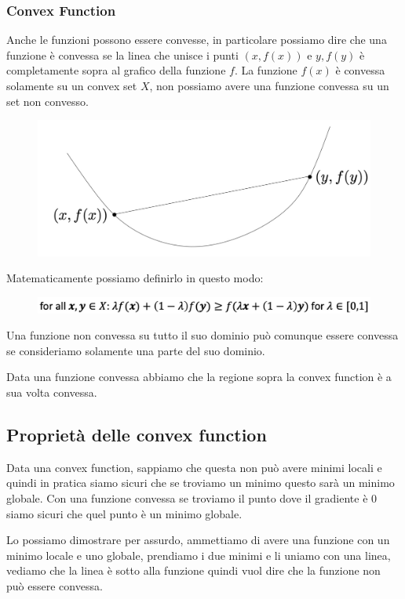 \documentclass[14pt]{extreport}
\begin{document}
\subsubsection{Convex Function}

Anche le funzioni possono essere convesse, in particolare possiamo dire che una funzione è convessa se la linea che unisce i punti $(x, f(x))$ e $y,
f(y)$ è completamente sopra al grafico della funzione $f$. La funzione $f(x)$ è convessa solamente su un convex set $X$, non possiamo avere una
funzione convessa su un set non convesso.


\begin{figure}[H]
\centering
\includegraphics[width=0.5\linewidth]{218.jpeg}
\end{figure}

Matematicamente possiamo definirlo in questo modo:

\begin{figure}[H]
\centering
\includegraphics[width=0.7\linewidth]{219.jpeg}
\end{figure}

Una funzione non convessa su tutto il suo dominio può comunque essere convessa se consideriamo solamente una parte del suo dominio.

Data una funzione convessa abbiamo che la regione sopra la convex function è a sua volta convessa.

\subsection{Proprietà delle convex function}

Data una convex function, sappiamo che questa non può avere minimi locali e quindi in pratica siamo sicuri che se troviamo un minimo questo sarà un
minimo globale. Con una funzione convessa se troviamo il punto dove il gradiente è 0 siamo sicuri che quel punto è un minimo globale.

Lo possiamo dimostrare per assurdo, ammettiamo di avere una funzione con un minimo locale e uno globale, prendiamo i due minimi e li uniamo con una
linea, vediamo che la linea è sotto alla funzione quindi vuol dire che la funzione non può essere convessa.
\end{document}
